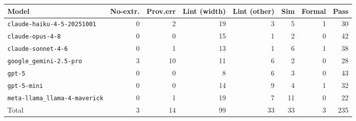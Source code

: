 \begin{tabular}{lrrrrrrr}
\toprule
Model & No-extr. & Prov.err & Lint (width) & Lint (other) & Sim & Formal & Pass \\
\midrule
\texttt{claude-haiku-4-5-20251001} & 0 & 2 & 19 & 3 & 5 & 1 & 30 \\
\texttt{claude-opus-4-8} & 0 & 0 & 15 & 1 & 2 & 0 & 42 \\
\texttt{claude-sonnet-4-6} & 0 & 1 & 13 & 1 & 6 & 1 & 38 \\
\texttt{google\_gemini-2.5-pro} & 3 & 10 & 11 & 6 & 2 & 0 & 28 \\
\texttt{gpt-5} & 0 & 0 & 8 & 6 & 3 & 0 & 43 \\
\texttt{gpt-5-mini} & 0 & 0 & 14 & 9 & 4 & 1 & 32 \\
\texttt{meta-llama\_llama-4-maverick} & 0 & 1 & 19 & 7 & 11 & 0 & 22 \\
\midrule
Total & 3 & 14 & 99 & 33 & 33 & 3 & 235 \\
\bottomrule
\end{tabular}
